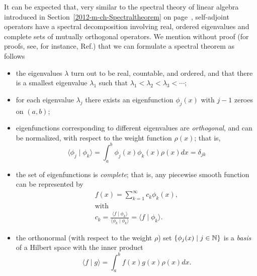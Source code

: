 It can be expected that, very similar to the spectral theory of linear algebra introduced in Section~\ref{2012-m-ch-Spectraltheorem}
on page~\pageref{2012-m-ch-Spectraltheorem}, self-adjoint operators have a spectral decomposition
involving real, ordered eigenvalues and complete sets of mutually orthogonal operators.
We mention without proof (for proofs, see, for instance, Ref.\cite{Al-Gwaiz}) that
we can formulate a spectral theorem as follows
\begin{itemize}
\item
the eigenvalues $\lambda$ turn out to be real, countable, and ordered, and that there is a smallest eigenvalue $\lambda_1$
such that $\lambda_1<\lambda_2<\lambda_3< \cdots$;

\item
for each eigenvalue $\lambda_j$ there exists an eigenfunction
$\phi_j(x)$ with $j-1$ zeroes on $(a,b)$;

\item
eigenfunctions corresponding to different eigenvalues are {\em orthogonal}, and can be normalized, with respect
to the weight function 
$\rho  (x)$; that is,
\begin{equation}
\langle \phi_j \mid \phi_k \rangle
=
\int_a^b
\phi_j (x)\phi_k(x)
\rho  (x)         dx
= \delta_{jk}
\label{2011-m-ch-slonef}
\end{equation}

\item
the set of eigenfunctions   is {\em complete}; that is, any piecewise smooth function can be represented by
\begin{equation}
\begin{split}
f(x)=\sum_{k=1}^\infty c_k\phi_k(x), \\
\textrm{with }     \\
c_k=\frac{ \langle f \mid \phi_k\rangle }  { \langle \phi_k \mid \phi_k\rangle }= \langle f \mid \phi_k\rangle .
\end{split}
\label{2011-m-ch-sleecom}
\end{equation}

\item
the orthonormal (with respect to the weight $\rho $) set $\{\phi_j(x)\mid j\in {\Bbb N}\}$
is a {\em basis} of a Hilbert space with the inner product
\begin{equation}
\langle f \mid g\rangle
=
\int_a^b
f (x) g(x)
\rho  (x)         dx
.
\label{2011-m-ch-slspbtf}
\end{equation}

\end{itemize}


